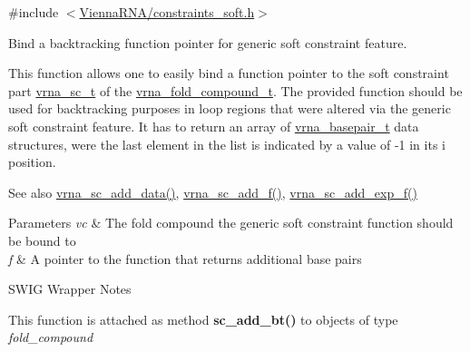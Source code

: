 {\ttfamily \#include $<$\hyperlink{constraints__soft_8h}{Vienna\+R\+N\+A/constraints\+\_\+soft.\+h}$>$}



Bind a backtracking function pointer for generic soft constraint feature. 

This function allows one to easily bind a function pointer to the soft constraint part \hyperlink{group__soft__constraints_ga75401ce219ef8dbcceb672db82d434c6}{vrna\+\_\+sc\+\_\+t} of the \hyperlink{group__fold__compound_ga1b0cef17fd40466cef5968eaeeff6166}{vrna\+\_\+fold\+\_\+compound\+\_\+t}. The provided function should be used for backtracking purposes in loop regions that were altered via the generic soft constraint feature. It has to return an array of \hyperlink{group__data__structures_gac8c5669d3fb813cacf506489689305ce}{vrna\+\_\+basepair\+\_\+t} data structures, were the last element in the list is indicated by a value of -\/1 in it\textquotesingle{}s i position.

\begin{DoxySeeAlso}{See also}
\hyperlink{group__soft__constraints_ga15c6d52471ec97897e2bb7f964f5deb6}{vrna\+\_\+sc\+\_\+add\+\_\+data()}, \hyperlink{group__soft__constraints_ga8c7d907ec0125cd61c04e0908010a4e9}{vrna\+\_\+sc\+\_\+add\+\_\+f()}, \hyperlink{group__soft__constraints_ga87e382b5d0c9b7d9ce1b79c0473ff700}{vrna\+\_\+sc\+\_\+add\+\_\+exp\+\_\+f()}
\end{DoxySeeAlso}

\begin{DoxyParams}{Parameters}
{\em vc} & The fold compound the generic soft constraint function should be bound to \\
\hline
{\em f} & A pointer to the function that returns additional base pairs\\
\hline
\end{DoxyParams}
\begin{DoxyRefDesc}{S\+W\+I\+G Wrapper Notes}
\item[\hyperlink{wrappers__wrappers000023}{S\+W\+I\+G Wrapper Notes}]This function is attached as method {\bfseries sc\+\_\+add\+\_\+bt()} to objects of type {\itshape fold\+\_\+compound} \end{DoxyRefDesc}
\mbox{\label{group__soft__constraints_ga87e382b5d0c9b7d9ce1b79c0473ff700}} 
